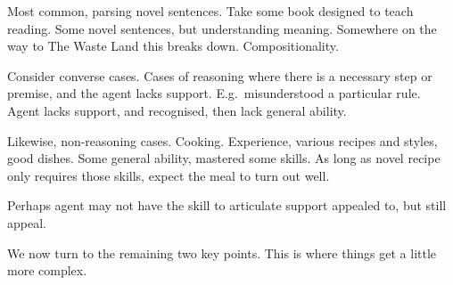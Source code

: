 \begin{note}
  Most common, parsing novel sentences.
  Take some book designed to teach reading.
  Some novel sentences, but understanding meaning.
  Somewhere on the way to The Waste Land this breaks down.
  Compositionality.

  Consider converse cases.
  Cases of reasoning where there is a necessary step or premise, and the agent lacks support.
  E.g.\ misunderstood a particular rule.
  Agent lacks support, and recognised, then lack general ability.

  Likewise, non-reasoning cases.
  Cooking.
  Experience, various recipes and styles, good dishes.
  Some general ability, mastered some skills.
  As long as novel recipe only requires those skills, expect the meal to turn out well.

  Perhaps agent may not have the skill to articulate support appealed to, but still appeal.
\end{note}

\begin{note}
  We now turn to the remaining two key points.
  This is where things get a little more complex.
\end{note}


